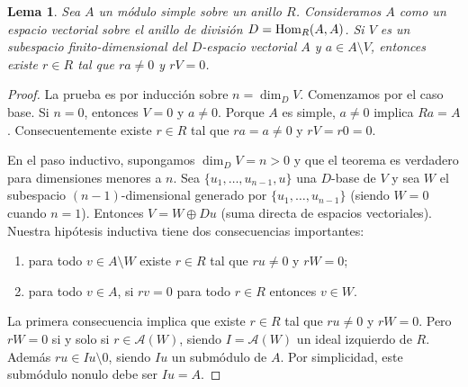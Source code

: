\documentclass{report}
\newcommand{\Hom}{\textnormal{Hom}}
\newtheorem{lemma}{Lema}
\begin{document}
  \begin{lemma}
    \label{lemma:anihilatorLemma}
    Sea \(A\) un módulo simple sobre un anillo \(R\).
    Consideramos \(A\) como un espacio vectorial sobre el anillo de división \(D = \Hom_R(A, A)\).
    Si \(V\) es un subespacio finito-dimensional del \(D\)-espacio vectorial \(A\) y \(a \in A \setminus V\), entonces existe \(r \in R\) tal que \(r a \neq 0\) y \(r V = 0\).
  \end{lemma}
  \begin{proof}
    La prueba es por inducción sobre \(n = \dim_D V\).
    Comenzamos por el caso base.
    Si \(n = 0\), entonces \(V = 0\) y \(a \neq 0\).
    Porque \(A\) es simple, \(a \neq 0\) implica \(R a = A\).
    Consecuentemente existe \(r \in R\) tal que \(r a = a \neq 0\) y \(r V = r 0 = 0\).

    En el paso inductivo, supongamos \(\dim_D V = n > 0\) y que el teorema es verdadero para dimensiones menores a \(n\).
    Sea \(\{u_1, \dots, u_{n - 1}, u\}\) una \(D\)-base de \(V\) y sea \(W\) el subespacio \((n - 1)\)-dimensional generado por \(\{u_1, \dots, u_{n - 1}\}\) (siendo \(W = 0\) cuando \(n = 1\)).
    Entonces \(V = W \oplus D u\) (suma directa de espacios vectoriales).
    Nuestra hipótesis inductiva tiene dos consecuencias importantes:
    \begin{enumerate}
      \item para todo \(v \in A \setminus W\) existe \(r \in R\) tal que \(r u \neq 0\) y \(r W = 0\);
      \item para todo \(v \in A\), si \(r v = 0\) para todo \(r \in R\) entonces \(v \in W\).
    \end{enumerate}
    La primera consecuencia implica que existe \(r \in R\) tal que \(r u \neq 0\) y \(r W = 0\).
    Pero \(r W = 0\) si y solo si \(r \in \mathcal{A}(W)\), siendo \(I = \mathcal{A}(W)\) un ideal izquierdo de \(R\).
    Además \(r u \in I u \setminus 0\), siendo \(I u\) un submódulo de \(A\).
    Por simplicidad, este submódulo nonulo debe ser \(I u = A\).


\end{proof}
\end{document}
